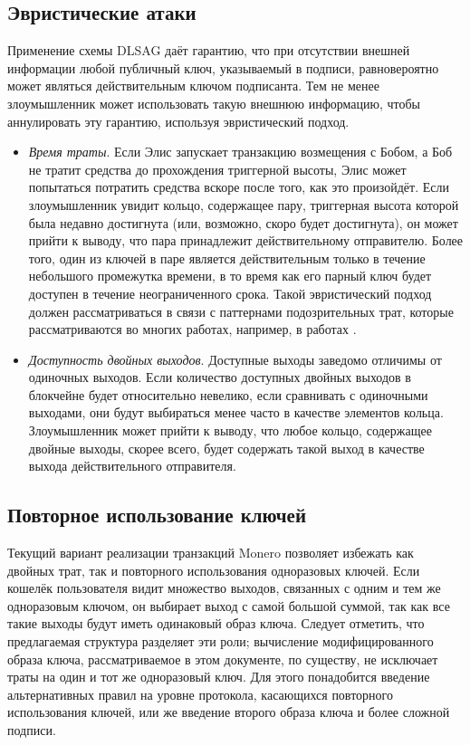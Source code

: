 \documentclass{mrl}
\begin{document}
\subsection{Эвристические атаки}
Применение схемы DLSAG даёт гарантию, что при отсутствии внешней информации любой публичный ключ, указываемый в подписи, равновероятно может являться действительным ключом подписанта. Тем не менее злоумышленник может использовать такую внешнюю информацию, чтобы аннулировать эту гарантию, используя эвристический подход.
\begin{itemize}
\item \textit{Время траты}. Если Элис запускает транзакцию возмещения с Бобом, а Боб не тратит средства до прохождения триггерной высоты, Элис может попытаться потратить средства вскоре после того, как это произойдёт. Если злоумышленник увидит кольцо, содержащее пару, триггерная высота которой была недавно достигнута (или, возможно, скоро будет достигнута), он может прийти к выводу, что пара принадлежит действительному отправителю. Более того, один из ключей в паре является действительным только в течение небольшого промежутка времени, в то время как его парный ключ будет доступен в течение неограниченного срока. Такой эвристиче\-ский подход должен рассматриваться в связи с паттернами подозрительных трат, которые рассматриваются во многих работах, например, в работах \cite{monerolink,monerolink2}.
\item \textit{Доступность двойных выходов}. Доступные выходы заведомо отличимы от одиночных выходов. Если количество доступных двойных выходов в блокчейне будет относительно невелико, если сравнивать с одиночными выходами, они будут выбираться менее часто в качестве элементов кольца. Злоумышленник может прийти к выводу, что любое кольцо, содержащее двойные выходы, скорее всего, будет содержать такой выход в качестве выхода действительного отправителя.
\end{itemize}

\subsection{Повторное использование ключей}
Текущий вариант реализации транзакций Monero позволяет избежать как двойных трат, так и повторного использования одноразовых ключей. Если кошелёк пользователя видит множество выходов, связанных с одним и тем же одноразовым ключом, он выбирает выход с самой большой суммой, так как все такие выходы будут иметь одинаковый образ ключа. Следует отметить, что предлагаемая структура разделяет эти роли; вычисление модифицированного образа ключа, рассматриваемое в этом документе, по существу, не исключает траты на один и тот же одноразовый ключ. Для этого понадобится введение альтернативных правил на уровне протокола, касающихся повторного использования ключей, или же введение второго образа ключа и более сложной подписи.
\end{document}
